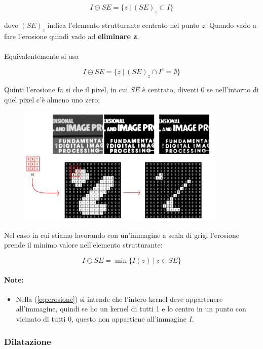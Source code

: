 \begin{equation}\label{eq:erosione}
    I \ominus SE = \{z \ | \ (SE)_z \subset I\}
\end{equation}

dove $(SE)_z$ indica l'elemento strutturante centrato nel punto $z$.
Quando vado a fare l'erosione quindi vado ad \textbf{eliminare z}.
\\\\
Equivalentemente si usa

$$
    I \ominus SE = \{z \ | \ (SE)_z \cap I^c = \emptyset\}
$$

Quinti l'erosione fa si che il pixel, in cui $SE$ è centrato, diventi 0 se nell'intorno di quel pixel c'è almeno uno zero;

\begin{figure}[H]
    \centering
    \includegraphics[width=10cm, keepaspectratio]{capitoli/immagini/imgs/erosione-esempio.png}
\end{figure}

Nel caso in cui stiamo lavorando con un'immagine a scala di grigi l'erosione prende il minimo valore nell'elemento strutturante:

$$
    I \ominus SE = \min\{I(z) \ | \ z \in SE\}
$$


\paragraph{Note:}
\begin{itemize}
    \item Nella (\ref{eq:erosione}) si intende che l'intero kernel deve appartenere all'immagine, quindi se ho un kernel di tutti 1 e lo centro in un punto con vicinato di tutti 0, questo non appartiene all'immagine $I$.
\end{itemize}

\subsubsection{Dilatazione}

